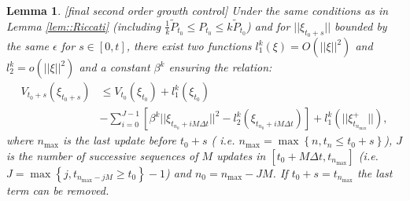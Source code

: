 \documentclass[a4paper,12pt,onecolumn]{article}
\newtheorem{lem}{Lemma}
\begin{document}
\begin{lem}\emph{[final second order growth control]}
Under the same conditions as in Lemma \ref{lem::Riccati} (including $\frac{1}{k} \tilde{P}_{t_0} \leq P_{t_0} \leq k \tilde{P}_{t_0}$)  and for $||\xi_{t_0+s}||$ bounded by the same $\epsilon$ for $s \in [0,t]$, there exist two functions $l_1^{k}(\xi) = O(||\xi||^2)$ and $l_2^{k}=o(||\xi||^2)$ and a constant $\beta^{k}$ ensuring the relation:
\begin{align}
V_{t_0+s}(\xi_{t_0+s}) & \leq V_{t_0}(\xi_{t_0}) + l_1^{k} (\xi_{t_0}) \\
 & -  \sum_{i=0}^{J-1} \left[ \beta^{k} ||\xi_{t_{ n_0}+iM \Delta t}||^2 - l_2^k (\xi_{t_{ n_0}+iM \Delta t}) \right]
+ l_1^k(||\xi_{t_{n_{\max}}}^+||),
\label{eq::Lyapounov}
\end{align}
where ${n_{\max}}$ is the last update before $t_0+s$ ( i.e. ${n_{\max}}  = \max \left\lbrace n, t_n \leq t_0+s \right\rbrace$), $J$ is the number of successive sequences of $M$ updates in $[t_0+M \Delta t,t_{n_{\max}}]$ (i.e. $J = \max \left\lbrace j, t_{n_{\max}-jM} \geq t_0 \right\rbrace -1 $) and $n_0 = n_{\max} - JM$. If $t_0+s=t_{n_{\max}}$ the last term can be removed.
\label{lem::Lyapounov}
\end{lem}
\end{document}
